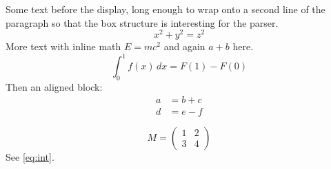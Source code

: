 \documentclass[11pt]{article}
\begin{document}
Some text before the display, long enough to wrap onto a second line of
the paragraph so that the box structure is interesting for the parser.
\[
  x^2 + y^2 = z^2
\]
More text with inline math $E=mc^2$ and again $a+b$ here.
\begin{equation}
  \int_0^1 f(x)\,dx = F(1) - F(0) \label{eq:int}
\end{equation}
Then an aligned block:
\begin{align}
  a &= b + c \\
  d &= e - f
\end{align}

\begin{equation}
  M = \begin{pmatrix} 1 & 2 \\ 3 & 4 \end{pmatrix}
\end{equation}
See \eqref{eq:int}.

\end{document}
